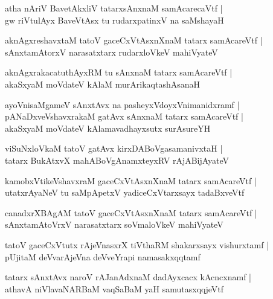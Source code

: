 \documentclass[twoside,12pt,openright]{book}
\newcounter{shloka}[chapter]
\begin{document}
\begin{shloka}
atha nAriV BavetAkxliV tatarxsAnxnaM samAcarecaVtf |\\
gw riVtulAyx BaveVtAsx tu rudarxpatinxV na saMshayaH 
\end{shloka}

\begin{shloka}
aknAgxreshavxtaM tatoV gaceCxVtAsxnXnaM tatarx samAcareVtf |\\
sAnxtamAtorxV narasatxtarx rudarxloVkeV mahiVyateV 
\end{shloka}

\begin{shloka}
aknAgxrakacatuthAyxRM tu sAnxnaM tatarx samAcareVtf |\\
akaSxyaM moVdateV kAlaM murArikaqtashAsanaH 
\end{shloka}

\begin{shloka}
ayoVnisaMgameV sAnxtAvx na pasheyxVdoyxVnimanidxramf |\\
pANaDxveVshavxrakaM gatAvx sAnxnaM tatarx samAcareVtf |\\
akaSxyaM moVdateV kAlamavadhayxsutx surAsureYH
\end{shloka}

\begin{shloka}
viSuNxloVkaM tatoV gatAvx kirxDABoVgasamanivxtaH |\\
tatarx BukAtxvX mahABoVgAnamxteyxRV rAjABijAyateV 
\end{shloka}

\begin{shloka}
kamobxVtikeVshavxraM gaceCxVtAsxnXnaM tatarx samAcareVtf |\\
utatxrAyaNeV tu saMpApetxV yadiceCxVtarxsayx tadaBxveVtf
\end{shloka}

\begin{shloka}
canadxrXBAgAM tatoV gaceCxVtAsxnXnaM tatarx samAcareVtf |\\
sAnxtamAtoVrxV narasatxtarx soVmaloVkeV mahiVyateV
\end{shloka}

\begin{shloka}
tatoV gaceCxVtutx rAjeVnasxrX tiVthaRM shakarxsayx vishurxtamf |\\
pUjitaM deVvarAjeVna deVveYrapi namasakxqqtamf 
\end{shloka}

\begin{shloka}
tatarx sAnxtAvx naroV rAJanAdxnaM dadAyxcacx kAcncxnamf |\\
athavA niVlavaNARBaM vaqSaBaM yaH samutasxqqjeVtf 
\end{shloka}
\end{document}
